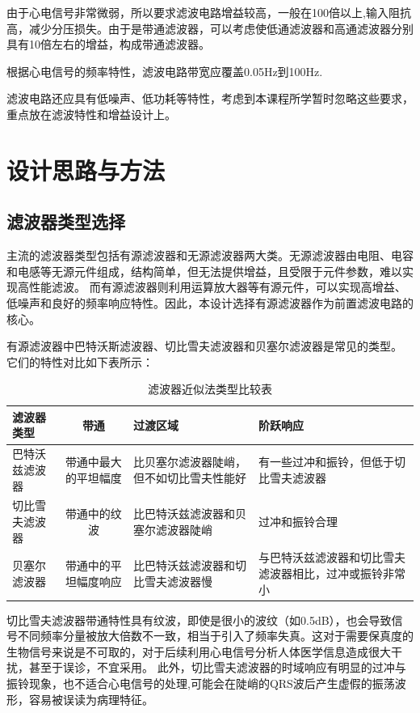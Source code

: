 \documentclass[10pt,a4paper]{ctexart}
\begin{document}
由于心电信号非常微弱，所以要求滤波电路增益较高，一般在100倍以上,输入阻抗高，减少分压损失。由于是带通滤波器，可以考虑使低通滤波器和高通滤波器分别具有10倍左右的增益，构成带通滤波器。

根据心电信号的频率特性，滤波电路带宽应覆盖0.05Hz到100Hz.

滤波电路还应具有低噪声、低功耗等特性，考虑到本课程所学暂时忽略这些要求，重点放在滤波特性和增益设计上。



\section{设计思路与方法}
\subsection{滤波器类型选择}
主流的滤波器类型包括有源滤波器和无源滤波器两大类。无源滤波器由电阻、电容和电感等无源元件组成，结构简单，但无法提供增益，且受限于元件参数，难以实现高性能滤波。
而有源滤波器则利用运算放大器等有源元件，可以实现高增益、低噪声和良好的频率响应特性。因此，本设计选择有源滤波器作为前置滤波电路的核心。

有源滤波器中巴特沃斯滤波器、切比雪夫滤波器和贝塞尔滤波器是常见的类型。
它们的特性对比如下表所示\cite{filter_design}：

\begin{table}[H]
\centering
\caption{滤波器近似法类型比较表}
\label{tab:filter_comparison}
\begin{tabularx}{\textwidth}{XcXX}
\toprule
\textbf{滤波器类型} & \textbf{带通} & \textbf{过渡区域} & \textbf{阶跃响应} \\
\midrule
巴特沃兹滤波器 & 带通中最大的平坦幅度 & 比贝塞尔滤波器陡峭，但不如切比雪夫性能好 & 有一些过冲和振铃，但低于切比雪夫滤波器 \\
\hline
切比雪夫滤波器 & 带通中的纹波 & 比巴特沃兹滤波器和贝塞尔滤波器陡峭 & 过冲和振铃合理 \\
\hline
贝塞尔滤波器 & 带通中的平坦幅度响应 & 比巴特沃兹滤波器和切比雪夫滤波器慢 & 与巴特沃兹滤波器和切比雪夫滤波器相比，过冲或振铃非常小 \\
\bottomrule
\end{tabularx}
\end{table}

切比雪夫滤波器带通特性具有纹波，即使是很小的波纹（如0.5dB），也会导致信号不同频率分量被放大倍数不一致，相当于引入了频率失真。这对于需要保真度的生物信号来说是不可取的，对于后续利用心电信号分析人体医学信息造成很大干扰，甚至于误诊，不宜采用。
此外，切比雪夫滤波器的时域响应有明显的过冲与振铃现象，也不适合心电信号的处理,可能会在陡峭的QRS波后产生虚假的振荡波形，容易被误读为病理特征。
\end{document}
